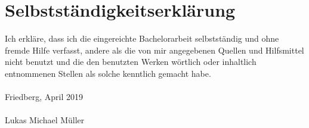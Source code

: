 \chapter{Selbstständigkeitserklärung}
\label{cha:erklaerung}
%
%
Ich erkläre, dass ich die eingereichte Bachelorarbeit selbstständig und ohne fremde Hilfe verfasst, andere als die von mir angegebenen Quellen und Hilfsmittel nicht benutzt und die den benutzten Werken wörtlich oder inhaltlich entnommenen Stellen als solche kenntlich gemacht habe. \\
%
\vspace{.2cm} \\
\noindent Friedberg, April 2019 \\
%
\vspace{2cm} \\
\noindent Lukas Michael Müller \\
%
%
%
